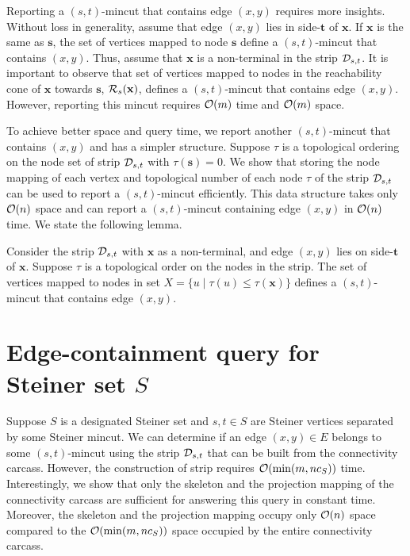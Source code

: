 Reporting a $(s,t)$-mincut that contains edge $(x,y)$ requires more insights. Without loss in generality, assume that edge $(x,y)$ lies in side-$\mathbf t$ of $\mathbf x$. If $\mathbf x$ is the same as $\mathbf s$, the set of vertices mapped to node $\mathbf s$ define a $(s,t)$-mincut that contains $(x,y)$. Thus, assume that $\mathbf x$ is a non-terminal in the strip ${\cal D}_{s,t}$. It is important to observe that set of vertices mapped to nodes in the reachability cone of $\mathbf x$ towards $\mathbf s$, ${\cal R}_s({\mathbf x})$, defines a $(s,t)$-mincut that contains edge $(x,y)$. However, reporting this mincut requires ${\cal O}(m)$ time and ${\cal O}(m)$ space. 

To achieve better space and query time, we report another $(s,t)$-mincut that contains $(x,y)$ and has a simpler structure. Suppose $\tau$ is a topological ordering on the node set of strip ${\cal D}_{s,t}$ with $\tau(\mathbf s) = 0$. We show that storing the node mapping of each vertex and topological number of each node $\tau$ of the strip ${\cal D}_{s,t}$ can be used to report a $(s,t)$-mincut efficiently. 
This data structure takes only ${\cal O}(n)$ space and can report a $(s,t)$-mincut containing edge $(x,y)$ in ${\cal O}(n)$ time. We state the following lemma.

\begin{lemma}
\label{lem:s-t-mincut-containing-x-y-topological-fixed}
Consider the strip ${\cal D}_{s,t}$ with ${\mathbf x}$ as a non-terminal, and edge $(x,y)$ lies on side-${\mathbf t}$ of ${\mathbf x}$. Suppose $\tau$ is a topological order on the nodes in the strip. The set of vertices mapped to nodes in set $X = \{u \;|\; \tau(u) \leq \tau(\mathbf x)\}$ defines a $(s,t)$-mincut that contains edge $(x,y)$.
\end{lemma}

\section{Edge-containment query for Steiner set $S$} \label{subsec:edge-containment-ds-steiner}

Suppose $S$ is a designated Steiner set and $s,t\in S$ are Steiner vertices separated by some Steiner mincut. We can determine if an edge $(x,y)\in E$ belongs to some $(s,t)$-mincut using the strip ${\cal D}_{s,t}$ that can be built from the connectivity carcass. However, the construction of strip requires ${\cal O}(\min(m,nc_S))$ time. Interestingly, we show that only the skeleton and the projection mapping of the connectivity carcass are sufficient for answering this query in constant time. Moreover, the skeleton and the projection mapping occupy only ${\cal O}(n)$ space compared to the ${\cal O}(\min(m,nc_S))$ space occupied by the entire connectivity carcass.

